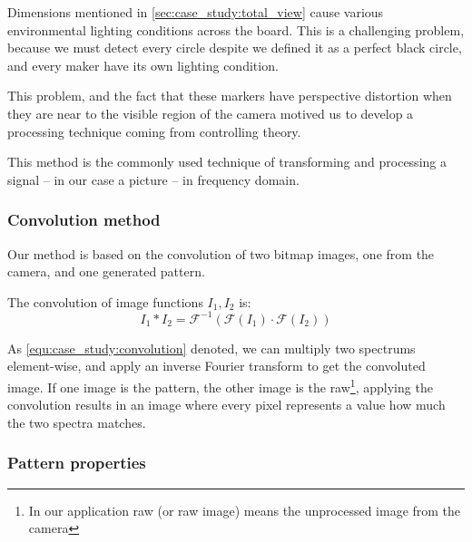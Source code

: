 Dimensions mentioned in \cref{sec:case_study:total_view} cause various environmental lighting conditions across the board. This is a challenging problem, because we must detect every circle despite we defined it as a perfect black circle, and every maker have its own lighting condition. 

This problem, and the fact that these markers have perspective distortion when they are near to the visible region of the camera motived us to develop a processing technique coming from controlling theory.

This method is the commonly used technique of transforming and processing a signal -- in our case a picture -- in frequency domain.

\subsubsection{Convolution method}

Our method is based on the convolution of two bitmap images, one from the camera, and one generated pattern.

\begin{dfn}
	The convolution of image functions $I_1, I_2$ is:
	\begin{equation}
		\label{equ:case_study:convolution}
		I_1 \ast I_2 = \mathscr{F}^{-1}(\mathscr{F}(I_1) \cdot \mathscr{F}(I_2))
	\end{equation}
\end{dfn}

As \cref{equ:case_study:convolution} denoted, we can multiply two spectrums element-wise, and apply an inverse Fourier transform to get the convoluted image. If one image is the pattern, the other image is the raw\footnote{In our application raw (or raw image) means the unprocessed image from the camera}, applying the convolution results in an image where every pixel represents a value how much the two spectra matches.

\subsubsection{Pattern properties}



